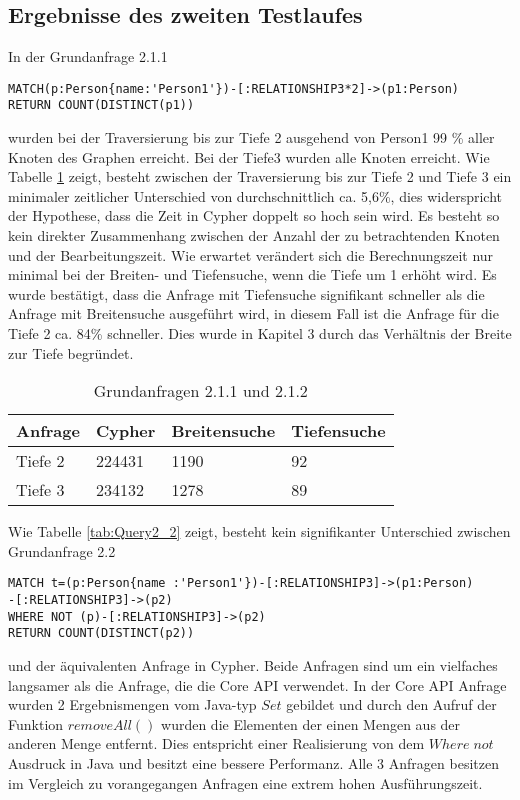 \subsection{Ergebnisse des zweiten Testlaufes}
In der Grundanfrage 2.1.1
\begin{Verbatim}[frame=single]
MATCH(p:Person{name:'Person1'})-[:RELATIONSHIP3*2]->(p1:Person) 
RETURN COUNT(DISTINCT(p1))
\end{Verbatim}
 wurden bei der Traversierung bis zur Tiefe 2 ausgehend von Person1 99 \% aller Knoten des Graphen erreicht. Bei der Tiefe3 wurden alle Knoten erreicht. Wie Tabelle \ref{tab:Query2_1} zeigt, besteht zwischen der Traversierung bis zur Tiefe 2 und Tiefe 3  ein minimaler zeitlicher Unterschied von durchschnittlich ca. 5,6\%, dies widerspricht der Hypothese, dass die Zeit in Cypher doppelt so hoch sein wird. Es besteht so kein direkter Zusammenhang zwischen der Anzahl der zu betrachtenden Knoten und der Bearbeitungszeit. Wie erwartet verändert sich die Berechnungszeit nur minimal bei der Breiten- und Tiefensuche, wenn die Tiefe um 1 erhöht wird.  \newline 
Es wurde bestätigt, dass die Anfrage mit Tiefensuche signifikant schneller als die Anfrage mit Breitensuche ausgeführt wird, in diesem Fall ist die Anfrage für die Tiefe 2 ca. 84\% schneller. Dies wurde in Kapitel 3 durch das Verhältnis der Breite zur Tiefe begründet. 
\FloatBarrier
\begin{table}[h]
\centering
		\begin{tabular}{ |p{3cm}||p{3cm}|p{3cm}|p{3cm}|  }
			\hline
			Anfrage& Cypher & Breitensuche&Tiefensuche\\
			\hline
			Tiefe 2   & 224431    & 1190&  92\\
			Tiefe 3&    234132  & 1278   & 89\\
			\hline
		\end{tabular}
		\caption{Grundanfragen 2.1.1 und 2.1.2}
		\label{tab:Query2_1}
\end{table}
\FloatBarrier
\noindent Wie Tabelle \ref{tab:Query2_2} zeigt, besteht kein  signifikanter Unterschied zwischen Grundanfrage 2.2
\begin{Verbatim}[frame=single]
MATCH t=(p:Person{name :'Person1'})-[:RELATIONSHIP3]->(p1:Person)
-[:RELATIONSHIP3]->(p2)
WHERE NOT (p)-[:RELATIONSHIP3]->(p2) 
RETURN COUNT(DISTINCT(p2))
\end{Verbatim} 
 und der äquivalenten Anfrage in Cypher. Beide Anfragen sind um ein vielfaches langsamer als die Anfrage, die die Core API verwendet. In der Core API Anfrage wurden 2 Ergebnismengen vom Java-typ $Set$ gebildet und durch den Aufruf der Funktion $removeAll()$  wurden die Elementen der einen Mengen aus der anderen Menge entfernt. Dies entspricht einer Realisierung von dem $Where\;not$ Ausdruck  in Java und besitzt eine bessere Performanz. Alle 3 Anfragen besitzen im Vergleich zu vorangegangen Anfragen eine extrem hohen Ausführungszeit.
